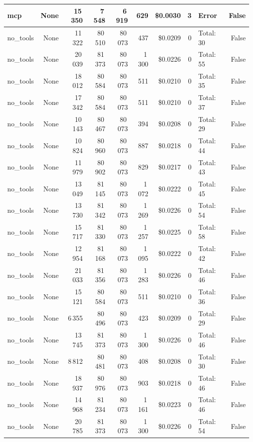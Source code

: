 \documentclass[a4paper,11pt]{article}
\begin{document}
\begin{table}[H]
{\begin{tabular}{l r r r r r r r l r}
mcp & None & 15\,350 & 7\,548 & 6\,919 & 629 & \$0.0030 & 3 & Error & False \\
\midrule
no\_tools & None & 11\,322 & 80\,510 & 80\,073 & 437 & \$0.0209 & 0 & Total: 30 & False \\
no\_tools & None & 20\,039 & 81\,373 & 80\,073 & 1\,300 & \$0.0226 & 0 & Total: 55 & False \\
no\_tools & None & 18\,012 & 80\,584 & 80\,073 & 511 & \$0.0210 & 0 & Total: 35 & False \\
no\_tools & None & 17\,342 & 80\,584 & 80\,073 & 511 & \$0.0210 & 0 & Total: 37 & False \\
no\_tools & None & 10\,143 & 80\,467 & 80\,073 & 394 & \$0.0208 & 0 & Total: 29 & False \\
no\_tools & None & 10\,824 & 80\,960 & 80\,073 & 887 & \$0.0218 & 0 & Total: 44 & False \\
no\_tools & None & 11\,979 & 80\,902 & 80\,073 & 829 & \$0.0217 & 0 & Total: 43 & False \\
no\_tools & None & 13\,049 & 81\,145 & 80\,073 & 1\,072 & \$0.0222 & 0 & Total: 45 & False \\
no\_tools & None & 13\,730 & 81\,342 & 80\,073 & 1\,269 & \$0.0226 & 0 & Total: 54 & False \\
no\_tools & None & 15\,717 & 81\,330 & 80\,073 & 1\,257 & \$0.0225 & 0 & Total: 58 & False \\
no\_tools & None & 12\,954 & 81\,168 & 80\,073 & 1\,095 & \$0.0222 & 0 & Total: 42 & False \\
no\_tools & None & 21\,033 & 81\,356 & 80\,073 & 1\,283 & \$0.0226 & 0 & Total: 46 & False \\
no\_tools & None & 15\,121 & 80\,584 & 80\,073 & 511 & \$0.0210 & 0 & Total: 36 & False \\
no\_tools & None & 6\,355 & 80\,496 & 80\,073 & 423 & \$0.0209 & 0 & Total: 29 & False \\
no\_tools & None & 13\,745 & 81\,373 & 80\,073 & 1\,300 & \$0.0226 & 0 & Total: 46 & False \\
no\_tools & None & 8\,812 & 80\,481 & 80\,073 & 408 & \$0.0208 & 0 & Total: 30 & False \\
no\_tools & None & 18\,937 & 80\,976 & 80\,073 & 903 & \$0.0218 & 0 & Total: 46 & False \\
no\_tools & None & 14\,968 & 81\,234 & 80\,073 & 1\,161 & \$0.0223 & 0 & Total: 46 & False \\
no\_tools & None & 20\,785 & 81\,373 & 80\,073 & 1\,300 & \$0.0226 & 0 & Total: 54 & False \\

\end{tabular}}
\end{table}
\end{document}
